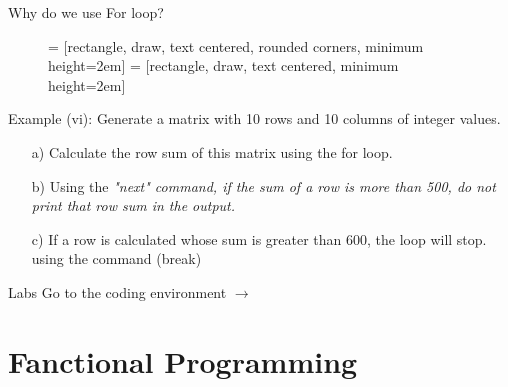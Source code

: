\documentclass{beamer}\usepackage[]{graphicx}\usepackage[]{xcolor}
\begin{document}
\begin{frame}{Why do we use For loop?}
    \begin{figure}
        \centering
     = [rectangle, draw, text centered, rounded corners, minimum height=2em]
     = [rectangle, draw, text centered, minimum height=2em]
\end{figure}
\end{frame}

\begin{frame}
    \begin{exampleblock}{Example (vi):}
Generate a matrix with 10 rows and 10 columns of integer values.
\begin{itemize}
    \item[a)] Calculate the row sum of this matrix using the for loop.
    \item[b)] Using the \it{"next"} command, if the sum of a row is more than 500, do not print that row sum in the output. 
    \item[c)] If a row is calculated whose sum is greater than 600, the loop will stop. using the command (break) 
\end{itemize}
    \end{exampleblock}
\end{frame}
\begin{frame}{Labs}
    \alert{{\Large Go to the coding environment $\rightarrow$}}
    \end{frame}

    


    \section{Fanctional Programming}
    
\end{document}

